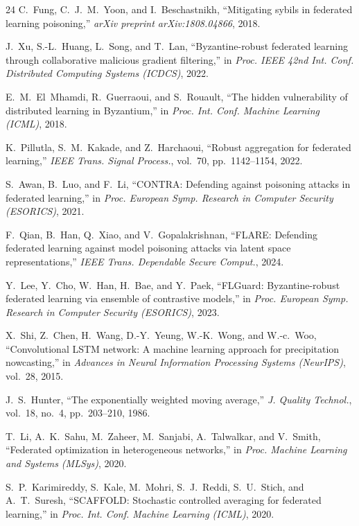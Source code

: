 \documentclass[journal]{IEEEtran}
\begin{document}
\begin{thebibliography}{24}
C.~Fung, C.~J.~M.~Yoon, and I.~Beschastnikh, ``Mitigating sybils in federated learning poisoning,'' \textit{arXiv preprint arXiv:1808.04866}, 2018.

J.~Xu, S.-L.~Huang, L.~Song, and T.~Lan, ``Byzantine-robust federated learning through collaborative malicious gradient filtering,'' in \textit{Proc. IEEE 42nd Int. Conf. Distributed Computing Systems (ICDCS)}, 2022.

E.~M.~El~Mhamdi, R.~Guerraoui, and S.~Rouault, ``The hidden vulnerability of distributed learning in Byzantium,'' in \textit{Proc. Int. Conf. Machine Learning (ICML)}, 2018.

K.~Pillutla, S.~M.~Kakade, and Z.~Harchaoui, ``Robust aggregation for federated learning,'' \textit{IEEE Trans. Signal Process.}, vol.~70, pp.~1142--1154, 2022.

S.~Awan, B.~Luo, and F.~Li, ``CONTRA: Defending against poisoning attacks in federated learning,'' in \textit{Proc. European Symp. Research in Computer Security (ESORICS)}, 2021.

F.~Qian, B.~Han, Q.~Xiao, and V.~Gopalakrishnan, ``FLARE: Defending federated learning against model poisoning attacks via latent space representations,'' \textit{IEEE Trans. Dependable Secure Comput.}, 2024.

Y.~Lee, Y.~Cho, W.~Han, H.~Bae, and Y.~Paek, ``FLGuard: Byzantine-robust federated learning via ensemble of contrastive models,'' in \textit{Proc. European Symp. Research in Computer Security (ESORICS)}, 2023.

X.~Shi, Z.~Chen, H.~Wang, D.-Y.~Yeung, W.-K.~Wong, and W.-c.~Woo, ``Convolutional LSTM network: A machine learning approach for precipitation nowcasting,'' in \textit{Advances in Neural Information Processing Systems (NeurIPS)}, vol.~28, 2015.

J.~S.~Hunter, ``The exponentially weighted moving average,'' \textit{J. Quality Technol.}, vol.~18, no.~4, pp.~203--210, 1986.

T.~Li, A.~K.~Sahu, M.~Zaheer, M.~Sanjabi, A.~Talwalkar, and V.~Smith, ``Federated optimization in heterogeneous networks,'' in \textit{Proc. Machine Learning and Systems (MLSys)}, 2020.

S.~P.~Karimireddy, S.~Kale, M.~Mohri, S.~J.~Reddi, S.~U.~Stich, and A.~T.~Suresh, ``SCAFFOLD: Stochastic controlled averaging for federated learning,'' in \textit{Proc. Int. Conf. Machine Learning (ICML)}, 2020.


\end{thebibliography}
\end{document}
